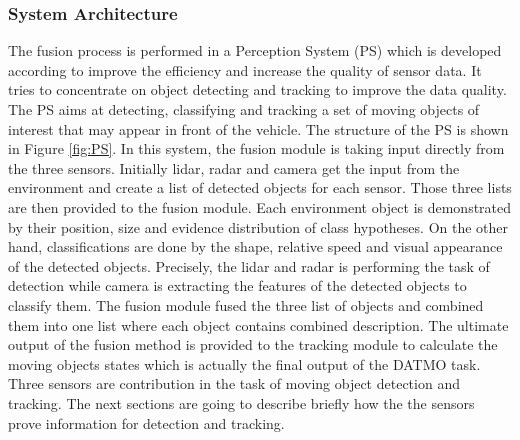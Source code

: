 \subsubsection{System Architecture}
The fusion process is performed in a Perception System (PS) which is developed according to improve the efficiency and increase the quality of sensor data. It tries to concentrate on object detecting and tracking to improve the data quality. The PS aims at detecting, classifying and tracking a set of moving objects of interest that may appear in front of the vehicle\cite{Chavez_Garcia_2016}. The structure of the  PS is shown in Figure \ref{fig:PS}. In this system, the fusion module is taking input directly from the three sensors. Initially lidar, radar and camera get the input from the environment and create a list of detected objects for each sensor. Those three lists are then provided to the fusion module. Each environment object is demonstrated by their position, size and evidence distribution of class hypotheses. On the other hand, classifications are done by the shape, relative speed and visual appearance of the detected objects. Precisely, the lidar and radar is performing the task of detection while camera is extracting the features of the detected objects to classify them. The fusion module fused the three list of objects and combined them into one list  where each object contains combined description. The ultimate output of the fusion method is provided to the tracking module to calculate the moving objects states which is actually the final output of the DATMO task. Three sensors are contribution in the task of moving object detection and tracking. The next sections are going to describe briefly how the the sensors prove information for detection and tracking.

